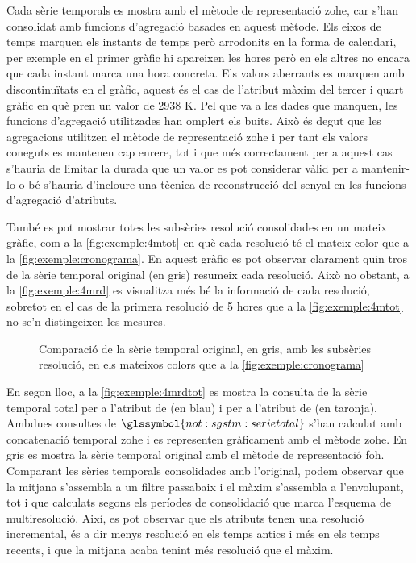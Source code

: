 Cada sèrie temporals es mostra amb el mètode de representació
\gls{zohe}, car s'han consolidat amb funcions d'agregació basades en
aquest mètode.  Els eixos de temps marquen els instants de temps però
arrodonits en la forma de calendari, per exemple en el primer gràfic
hi apareixen les hores però en els altres no encara que cada instant
marca una hora concreta.  Els valors aberrants es marquen amb
discontinuïtats en el gràfic, aquest és el cas de l'atribut màxim del
tercer i quart gràfic en què pren un valor de 2938 K.  Pel que va a
les dades que manquen, les funcions d'agregació utilitzades han
omplert els buits. Això és degut que les agregacions utilitzen el
mètode de representació \gls{zohe} i per tant els valors coneguts es
mantenen cap enrere, tot i que més correctament per a aquest cas
s'hauria de limitar la durada que un valor es pot considerar vàlid per
a mantenir-lo o bé s'hauria d'incloure una tècnica de reconstrucció
del senyal en les funcions d'agregació d'atributs.

També es pot mostrar totes les subsèries resolució consolidades en un
mateix gràfic, com a la \autoref{fig:exemple:4mtot} en què cada
resolució té el mateix color que a la
\autoref{fig:exemple:cronograma}. En aquest gràfic es pot observar
clarament quin tros de la sèrie temporal original (en gris) resumeix
cada resolució. Això no obstant, a la \autoref{fig:exemple:4mrd} es
visualitza més bé la informació de cada resolució, sobretot en el cas
de la primera resolució de 5 hores que a la
\autoref{fig:exemple:4mtot} no se'n distingeixen les mesures.


\begin{figure}[tp]
  \centering
  
  \caption{Comparació de la sèrie temporal original, en gris, amb les
    subsèries resolució, en els mateixos colors que a la
    \protect\autoref{fig:exemple:cronograma}}
  \label{fig:exemple:4mtot}
\end{figure}




En segon lloc, a la \autoref{fig:exemple:4mrdtot} es mostra la
consulta de la sèrie temporal total per a l'atribut de
 (en blau) i per a l'atribut de
 (en taronja). Ambdues consultes de
$\glssymbol{not:sgstm:serietotal}$ s'han calculat amb concatenació
temporal \gls{zohe} i es representen gràficament  amb el mètode \gls{zohe}. En gris es mostra la sèrie temporal original
amb el mètode de representació \gls{foh}.  Comparant les sèries
temporals consolidades amb l'original, podem observar que la mitjana
s'assembla a un filtre passabaix i el màxim s'assembla a l'envolupant,
tot i que calculats segons els períodes de consolidació que marca
l'esquema de multiresolució. Així, es pot observar que els atributs
tenen una resolució incremental, és a dir menys resolució en els temps
antics i més en els temps recents, i que la mitjana acaba tenint més
resolució que el màxim.


